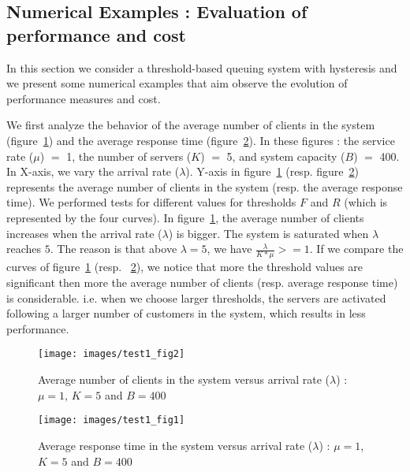\documentclass[conference]{IEEEtran}
\begin{document}
\subsection{Numerical Examples : Evaluation of performance and cost}
In this section we consider a threshold-based queuing system with hysteresis and we present some numerical examples that aim observe the evolution of performance measures and cost.

We first analyze the behavior of the average number of clients in the system (figure~\ref{fig:image-chap4-1_par_1-test1_fig2}) and the average response time (figure~\ref{fig:image-chap4-1_par_1-test1_fig1}). In these figures : the service rate ($\mu$) $=$ 1, the number of servers ($K$) $=$ 5, and system capacity ($B$) $=$ 400. In X-axis, we vary the arrival rate ($\lambda$). Y-axis in figure~\ref{fig:image-chap4-1_par_1-test1_fig2} (resp. figure~\ref{fig:image-chap4-1_par_1-test1_fig1}) represents the average number of clients in the system (resp. the average response time). We performed tests for different values for thresholds $F$ and $R$ (which is represented by the four curves). In figure~\ref{fig:image-chap4-1_par_1-test1_fig2}, the average number of clients increases when the arrival rate ($\lambda$) is bigger. The system is saturated when $\lambda$ reaches $5$. The reason is that above $\lambda=5$, we have $\frac{\lambda}  {K*\mu} >= 1$. If we compare the curves of figure~\ref{fig:image-chap4-1_par_1-test1_fig2} (resp. ~\ref{fig:image-chap4-1_par_1-test1_fig1}), we notice that more the threshold values are significant then more the average number of clients (resp. average response time) is considerable. i.e. when we choose larger thresholds, the servers are activated following a larger number of customers in the system, which results in less performance.

\begin{figure}[!t]
\centering
\texttt{[image: images/test1\_fig2]}
\caption{Average number of clients in the system versus arrival rate ($\lambda$) : $\mu=1$, $K=5$ and $B=400$}
\label{fig:image-chap4-1_par_1-test1_fig2}
\end{figure}

\begin{figure}[!t]
\centering
\texttt{[image: images/test1\_fig1]}
\caption{Average response time in the system versus arrival rate ($\lambda$) : $\mu=1$, $K=5$ and $B=400$}
\label{fig:image-chap4-1_par_1-test1_fig1}
\end{figure}
\end{document}
